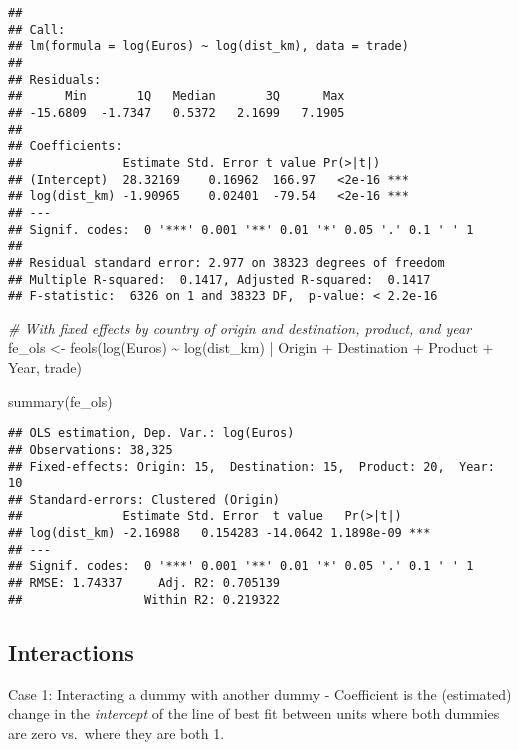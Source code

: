 \documentclass[
]{article}
\newenvironment{Shaded}{\begin{snugshade}}{\end{snugshade}}
\newcommand{\CommentTok}[1]{\textcolor[rgb]{0.56,0.35,0.01}{\textit{#1}}}
\newcommand{\FunctionTok}[1]{\textcolor[rgb]{0.00,0.00,0.00}{#1}}
\newcommand{\NormalTok}[1]{#1}
\newcommand{\OtherTok}[1]{\textcolor[rgb]{0.56,0.35,0.01}{#1}}
\newcommand{\SpecialCharTok}[1]{\textcolor[rgb]{0.00,0.00,0.00}{#1}}
\begin{document}
\begin{verbatim}
## 
## Call:
## lm(formula = log(Euros) ~ log(dist_km), data = trade)
## 
## Residuals:
##      Min       1Q   Median       3Q      Max 
## -15.6809  -1.7347   0.5372   2.1699   7.1905 
## 
## Coefficients:
##              Estimate Std. Error t value Pr(>|t|)    
## (Intercept)  28.32169    0.16962  166.97   <2e-16 ***
## log(dist_km) -1.90965    0.02401  -79.54   <2e-16 ***
## ---
## Signif. codes:  0 '***' 0.001 '**' 0.01 '*' 0.05 '.' 0.1 ' ' 1
## 
## Residual standard error: 2.977 on 38323 degrees of freedom
## Multiple R-squared:  0.1417, Adjusted R-squared:  0.1417 
## F-statistic:  6326 on 1 and 38323 DF,  p-value: < 2.2e-16
\end{verbatim}

\begin{Shaded}
\begin{Highlighting}[]
\CommentTok{\# With fixed effects by country of origin and destination, product, and year}
\NormalTok{fe\_ols }\OtherTok{\textless{}{-}} \FunctionTok{feols}\NormalTok{(}\FunctionTok{log}\NormalTok{(Euros) }\SpecialCharTok{\textasciitilde{}} \FunctionTok{log}\NormalTok{(dist\_km) }\SpecialCharTok{|}\NormalTok{ Origin }\SpecialCharTok{+}\NormalTok{ Destination }\SpecialCharTok{+}\NormalTok{ Product }\SpecialCharTok{+}\NormalTok{ Year, trade)}

\FunctionTok{summary}\NormalTok{(fe\_ols)}
\end{Highlighting}
\end{Shaded}

\begin{verbatim}
## OLS estimation, Dep. Var.: log(Euros)
## Observations: 38,325 
## Fixed-effects: Origin: 15,  Destination: 15,  Product: 20,  Year: 10
## Standard-errors: Clustered (Origin) 
##              Estimate Std. Error  t value   Pr(>|t|)    
## log(dist_km) -2.16988   0.154283 -14.0642 1.1898e-09 ***
## ---
## Signif. codes:  0 '***' 0.001 '**' 0.01 '*' 0.05 '.' 0.1 ' ' 1
## RMSE: 1.74337     Adj. R2: 0.705139
##                 Within R2: 0.219322
\end{verbatim}

\hypertarget{interactions}{%
\subsection{Interactions}\label{interactions}}

Case 1: Interacting a dummy with another dummy - Coefficient is the
(estimated) change in the \emph{intercept} of the line of best fit
between units where both dummies are zero vs.~where they are both 1.
\end{document}
